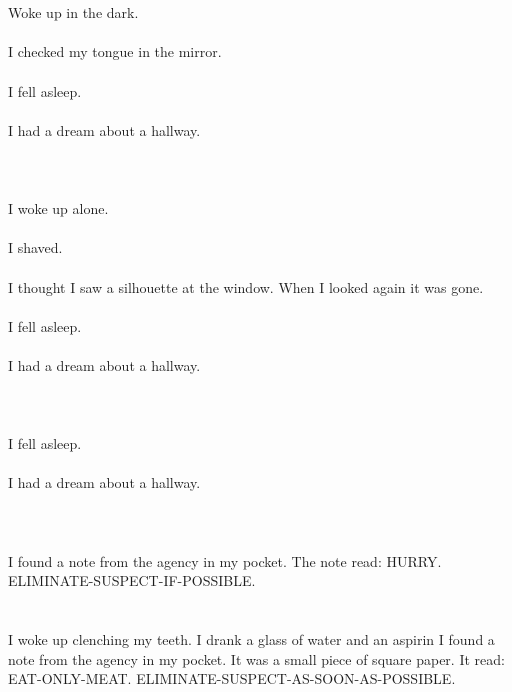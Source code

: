 \documentclass{article}
\begin{document}
    \section{}
    Woke up in the dark.\\\\I checked my tongue in the mirror.\\\\I fell asleep.\\\\I had a dream about a hallway.\\\\ 
    \newpage
    
    \section{}
    I woke up alone.\\\\I shaved.\\\\I thought I saw a silhouette at the window. When I looked again it was gone.\\\\I fell asleep.\\\\I had a dream about a hallway.\\\\ 
    \newpage
    
    \section{}
    I fell asleep.\\\\I had a dream about a hallway.\\\\ 
    \newpage
    
    \section{}
    I found a note from the agency in my pocket. The note read: HURRY. ELIMINATE-SUSPECT-IF-POSSIBLE.  
    \newpage
    
    \section{}
    I woke up clenching my teeth. I drank a glass of water and an aspirin I found a note from the agency in my pocket. It was a small piece of square paper. It read: EAT-ONLY-MEAT. ELIMINATE-SUSPECT-AS-SOON-AS-POSSIBLE.  
    \newpage
    
\end{document}
